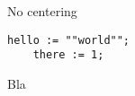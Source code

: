 \documentclass{beamer}
\begin{document}
\begin{frame}[fragile]{No centering}
    \centering
    \begin{minipage}{.381\textwidth}
  \begin{lstlisting}[gobble=4]
    hello := ""world"";
    there := 1;
  \end{lstlisting}
    \end{minipage}
  \par Bla\par
\end{frame}
\end{document}
